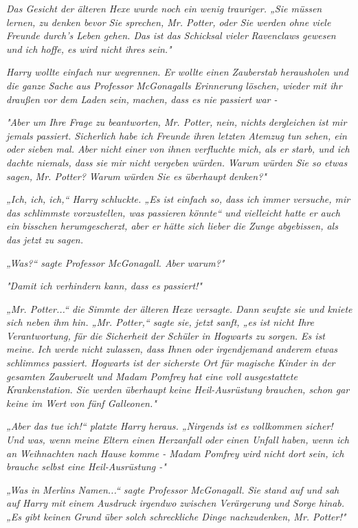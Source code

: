 {\emph{Das Gesicht der älteren Hexe wurde noch ein wenig trauriger. „Sie müssen lernen, zu denken bevor Sie sprechen, Mr. Potter, oder Sie werden ohne viele Freunde durch's Leben gehen. Das ist das Schicksal vieler} \emph{Ravenclaws gewesen und ich hoffe, es wird nicht ihres sein."}

\emph{Harry wollte einfach nur wegrennen. Er wollte einen Zauberstab herausholen und die ganze Sache aus Professor McGonagalls Erinnerung löschen, wieder mit ihr draußen vor dem Laden sein,} \emph{\emph{machen, dass es nie passiert war -}}

\emph{"Aber um Ihre Frage zu beantworten, Mr. Potter, nein, nichts} \emph{\emph{dergleichen}} \emph{ist mir jemals passiert. Sicherlich habe ich Freunde ihren letzten Atemzug tun sehen, ein oder sieben mal. Aber nicht einer von ihnen verfluchte mich, als er starb, und ich dachte niemals, dass sie mir nicht vergeben würden. Warum würden Sie so etwas} \emph{\emph{sagen,}} \emph{Mr. Potter? Warum würden Sie es überhaupt} \emph{\emph{denken?}"}

\emph{„Ich, ich, ich,“ Harry schluckte. „Es ist einfach so, dass ich immer versuche, mir das schlimmste vorzustellen, was passieren könnte“ und vielleicht hatte er auch ein bisschen herumgescherzt, aber er hätte sich lieber die Zunge abgebissen, als das jetzt zu sagen.}

\emph{„Was?“ sagte Professor McGonagall. Aber} \emph{\emph{warum?}"}

\emph{"Damit ich verhindern kann, dass es passiert!"}

\emph{„Mr. Potter...“ die Simmte der älteren Hexe versagte. Dann seufzte sie und kniete sich neben ihm hin. „Mr. Potter,“ sagte sie, jetzt sanft, „es ist nicht Ihre Verantwortung, für die Sicherheit der Schüler in Hogwarts zu sorgen. Es ist meine. Ich werde nicht zulassen, dass Ihnen oder irgendjemand anderem etwas schlimmes passiert. Hogwarts ist der sicherste Ort für magische Kinder in der gesamten Zauberwelt und Madam Pomfrey hat eine voll ausgestattete Krankenstation. Sie werden überhaupt keine Heil-Ausrüstung brauchen, schon gar keine im Wert von fünf Galleonen."}

\emph{„Aber das} \emph{\emph{tue}} \emph{ich!“ platzte Harry heraus. „\emph{Nirgends}} \emph{ist es vollkommen sicher! Und was, wenn meine Eltern einen Herzanfall oder einen Unfall haben, wenn ich an Weihnachten nach Hause komme - Madam Pomfrey wird nicht dort sein, ich brauche selbst eine Heil-Ausrüstung -"}

\emph{„\emph{Was}} \emph{in Merlins Namen...“ sagte Professor McGonagall. Sie stand auf und sah auf Harry mit einem Ausdruck irgendwo zwischen Verärgerung und Sorge hinab. „Es gibt keinen Grund über solch schreckliche Dinge nachzudenken, Mr. Potter!"}

}
